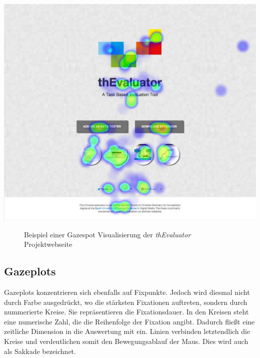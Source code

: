 \vspace{0.3cm}
\begin{center}
\includegraphics[scale=0.35]{./images/gazespot}
\end{center}
\begin{figure}[htb]
   \centering
   \caption{Beispiel einer Gazespot Visualisierung der \textit{thEvaluator} Projektwebseite}
    \label{gazespot}
\end{figure}


\subsection{Gazeplots}

Gazeplots konzentrieren sich ebenfalls auf Fixpunkte. Jedoch wird diesmal nicht durch Farbe ausgedrückt, wo die stärksten \Gls{Fixationen} auftreten, sondern durch nummerierte Kreise. Sie repräsentieren die Fixationsdauer. In den Kreisen steht eine numerische Zahl, die die Reihenfolge der Fixation angibt. Dadurch fließt eine zeitliche Dimension in die Auswertung mit ein. Linien verbinden letztendlich die Kreise und verdeutlichen somit den Bewegungsablauf der Maus. Dies wird auch als Sakkade bezeichnet.

